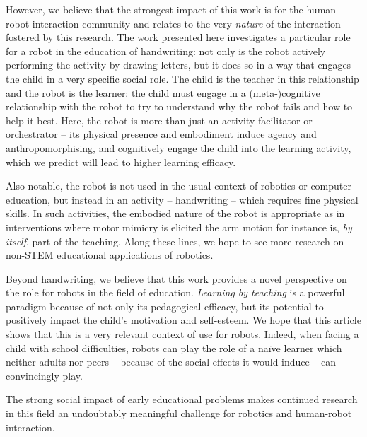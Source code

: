 \documentclass{sig-alternate}
\begin{document}
However, we believe that the strongest impact of this work is for the human-robot
interaction community and relates to the very \emph{nature} of the interaction
fostered by this research. The work presented here investigates a particular
role for a robot in the education of handwriting: not only is the robot actively
performing the activity by drawing letters, but it does so in a way that engages
the child in a very specific social role. The child is the teacher in this relationship and the robot is
the learner: the child must engage in a (meta-)cognitive relationship with the robot
to try to understand why the robot fails and how to help it best.  Here, the
robot is more than just an activity facilitator or orchestrator -- its physical presence
and embodiment induce agency and anthropomorphising, and cognitively engage the
child into the learning activity, which we predict will lead to higher learning
efficacy.

Also notable, the robot is not used in the usual context of robotics or computer
education, but instead in an activity -- handwriting -- which requires fine
physical skills. In such activities, the embodied nature of the robot is appropriate as in interventions where motor mimicry is elicited \cite{Berninger1997} the arm motion for instance is, \emph{by
itself}, part of the teaching. Along these lines, we hope to see more research
on non-STEM educational applications of robotics.

Beyond handwriting, we believe that this work provides a novel perspective on
the role for robots in the field of education. \emph{Learning by teaching} is a
powerful paradigm because of not only its pedagogical efficacy, but its
potential to positively impact the child's motivation and self-esteem. We hope that 
this article shows that this is a very relevant context of use for robots. Indeed,
when facing a child with school difficulties, robots can play the role of a na\"ive 
learner which neither adults nor peers -- because of the social effects it would 
induce -- can convincingly play.

The strong social impact of early educational problems makes continued research in this field
an undoubtably meaningful challenge for robotics and human-robot interaction.







\end{document}

